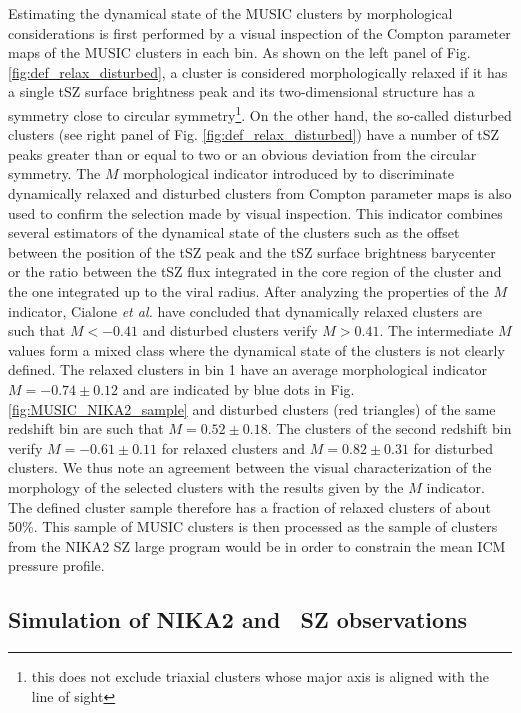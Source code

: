 \documentclass[twocolumn,traditabstract]{aa}
\begin{document}
Estimating the dynamical state of the MUSIC clusters by morphological considerations is first performed by a visual inspection of the Compton parameter maps of the MUSIC clusters in each bin. As shown on the left panel of Fig. \ref{fig:def_relax_disturbed}, a cluster is considered morphologically relaxed if it has a single tSZ surface brightness peak and its two-dimensional structure has a symmetry close to circular symmetry\footnote{this does not exclude triaxial clusters whose major axis is aligned with the line of sight}. On the other hand, the so-called disturbed clusters (see right panel of Fig. \ref{fig:def_relax_disturbed}) have a number of tSZ peaks greater than or equal to two or an obvious deviation from the circular symmetry. The $M$ morphological indicator introduced by \cite{cia18} to discriminate dynamically relaxed and disturbed clusters from Compton parameter maps is also used to confirm the selection made by visual inspection. This indicator combines several estimators of the dynamical state of the clusters such as the offset between the position of the tSZ peak and the tSZ surface brightness barycenter or the ratio between the tSZ flux integrated in the core region of the cluster and the one integrated up to the viral radius. After analyzing the properties of the $M$ indicator, Cialone \emph{et al.} have concluded that dynamically relaxed clusters are such that $M<-0.41$ and disturbed clusters verify $M>0.41$. The intermediate $M$ values form a mixed class where the dynamical state of the clusters is not clearly defined. The relaxed clusters in bin 1 have an average morphological indicator $M = -0.74 \pm 0.12$ and are indicated by blue dots in Fig. \ref{fig:MUSIC_NIKA2_sample} and disturbed clusters (red triangles) of the same redshift bin are such that $M = 0.52 \pm 0.18$. The clusters of the second redshift bin verify $M = -0.61 \pm 0.11$ for relaxed clusters and $M = 0.82\pm 0.31$ for disturbed clusters. We thus note an agreement between the visual characterization of the morphology of the selected clusters with the results given by the $M$ indicator. The defined cluster sample therefore has a fraction of relaxed clusters of about 50\%. This sample of MUSIC clusters is then processed as the sample of clusters from the NIKA2 SZ large program would be in order to constrain the mean ICM pressure profile.

\subsection{Simulation of NIKA2 and \planck\ SZ observations}\label{subsec:simu_obs}
\end{document}
